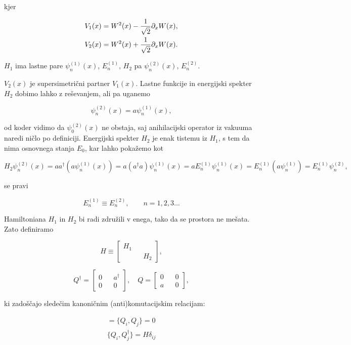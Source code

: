 kjer

\begin{align}
	V_1(x) &= W^2(x) - \frac{1}{\sqrt{2}}\partial_x W(x), \\
	V_2(x) &= W^2(x) + \frac{1}{\sqrt{2}}\partial_x W(x).
\end{align}

$H_1$ ima lastne pare $\psi^{(1)}_n(x)$, $E^{(1)}_n$, $H_2$ pa $\psi^{(2)}_n(x)$, $E^{(2)}_n$.

$V_2(x)$ je supersimetrični partner $V_1(x)$. Lastne funkcije in energijski spekter $H_2$
dobimo lahko z reševanjem, ali pa uganemo

\begin{equation}
	\psi^{(2)}_n(x) = a\psi^{(1)}_n(x),
\end{equation}

od koder vidimo da $\psi^{(2)}_0(x)$ ne obstaja, saj anihilacijski operator iz vakuuma naredi
ničlo po definiciji. Energijski spekter $H_2$ je enak tistemu iz $H_1$, s tem da nima
osnovnega stanja $E_0$, kar lahko pokažemo kot

\begin{equation}
	H_2\psi^{(2)}_n(x) = aa^\dagger (a\psi^{(1)}_n(x)) = a(a^\dagger a)\psi^{(1)}_n(x) =
		aE^{(1)}_n\psi^{(1)}_n(x) = E_n^{(1)}(a\psi_n^{(1)}) = E_n^{(1)}\psi_n^{(2)},
\end{equation}

se pravi

\begin{equation}
	E^{(1)}_n \equiv E^{(2)}_n, \qquad n = 1, 2, 3 \ldots
\end{equation}

Hamiltoniana $H_1$ in $H_2$ bi radi združili v enega, tako da se prostora ne mešata. Zato
definiramo

\begin{equation}
	H \equiv \begin{bmatrix}H_1& & \\ & &H_2 \end{bmatrix},
\end{equation}

\begin{equation}
	Q^\dagger = \begin{bmatrix} 0& &a^\dagger \\ 0& &0 \end{bmatrix}, \quad
	Q = \begin{bmatrix} 0& &0 \\ a& &0 \end{bmatrix},
\end{equation}

ki zadoščajo sledečim kanoničnim (anti)komutacijskim relacijam:

\begin{align}
	[Q_i,Q_j] = \{Q_i,Q_j\} = 0 \\
	\{Q_i,Q_j^\dagger\} = H\delta_{ij}
\end{align}


